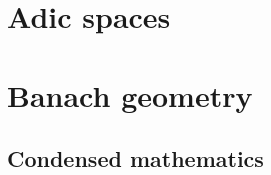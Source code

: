     \chapter{Adic spaces}
        \begin{abstract}
            
        \end{abstract}
        
        \minitoc
        
        
        
    \chapter{Banach geometry}
        \begin{abstract}
            
        \end{abstract}
        
        \minitoc
        
    \begin{appendices}
        \chapter{Condensed mathematics}
            \begin{abstract}
            
            \end{abstract}
            
            \minitoc
        
            
            
            
            
            
    \end{appendices}
	
	\printbibliography

